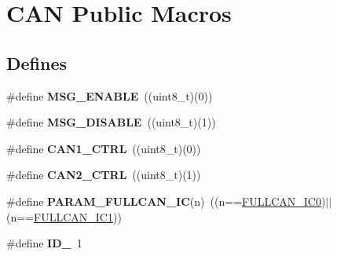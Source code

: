 \hypertarget{group___c_a_n___public___macros}{\section{\-C\-A\-N \-Public \-Macros}
\label{group___c_a_n___public___macros}
}
\subsection*{\-Defines}
\begin{DoxyCompactItemize}
\item 
\hypertarget{group___c_a_n___public___macros_ga2ccd2a1b26bedb106d97dfe21bd3a38b}{\#define {\bfseries \-M\-S\-G\-\_\-\-E\-N\-A\-B\-L\-E}~((uint8\-\_\-t)(0))}\label{group___c_a_n___public___macros_ga2ccd2a1b26bedb106d97dfe21bd3a38b}

\item 
\hypertarget{group___c_a_n___public___macros_ga937c4720a59283dc24596b9028429642}{\#define {\bfseries \-M\-S\-G\-\_\-\-D\-I\-S\-A\-B\-L\-E}~((uint8\-\_\-t)(1))}\label{group___c_a_n___public___macros_ga937c4720a59283dc24596b9028429642}

\item 
\hypertarget{group___c_a_n___public___macros_gaeb618f34f60dc1db0c7c61e56faf53ea}{\#define {\bfseries \-C\-A\-N1\-\_\-\-C\-T\-R\-L}~((uint8\-\_\-t)(0))}\label{group___c_a_n___public___macros_gaeb618f34f60dc1db0c7c61e56faf53ea}

\item 
\hypertarget{group___c_a_n___public___macros_gac4e5fc3836125841a4c745090b0529a6}{\#define {\bfseries \-C\-A\-N2\-\_\-\-C\-T\-R\-L}~((uint8\-\_\-t)(1))}\label{group___c_a_n___public___macros_gac4e5fc3836125841a4c745090b0529a6}

\item 
\hypertarget{group___c_a_n___public___macros_ga1cd144125ff4100b28a71c7c6c8eacf5}{\#define {\bfseries \-P\-A\-R\-A\-M\-\_\-\-F\-U\-L\-L\-C\-A\-N\-\_\-\-I\-C}(n)~((n==\hyperlink{group___c_a_n___public___types_gga68eb30e4e497ea667c93702fd807e994ac4a0c1b8842dedf1bc5c897c24a59da3}{\-F\-U\-L\-L\-C\-A\-N\-\_\-\-I\-C0})$|$$|$(n==\hyperlink{group___c_a_n___public___types_gga68eb30e4e497ea667c93702fd807e994a31162942d1304b5455cda1a0419ddf5b}{\-F\-U\-L\-L\-C\-A\-N\-\_\-\-I\-C1}))}\label{group___c_a_n___public___macros_ga1cd144125ff4100b28a71c7c6c8eacf5}

\item 
\hypertarget{group___c_a_n___public___macros_gad9963799567d31803873f77a7c5a7cd3}{\#define {\bfseries \-I\-D\-\_}~1}\label{group___c_a_n___public___macros_gad9963799567d31803873f77a7c5a7cd3}


\end{DoxyCompactItemize}
